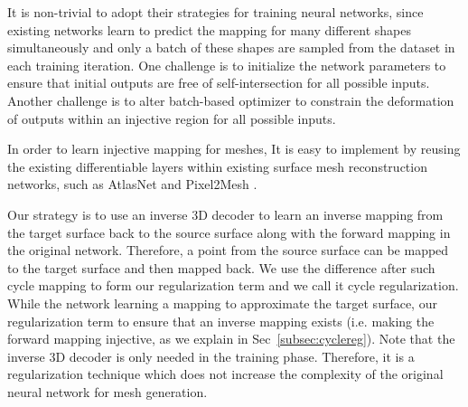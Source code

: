 
It is non-trivial to adopt their strategies for training neural networks, since existing networks learn to predict the mapping for many different shapes simultaneously and only a batch of these shapes are sampled from the dataset in each training iteration. One challenge is to initialize the network parameters to ensure that initial outputs are free of self-intersection for all possible inputs. Another challenge is to alter batch-based optimizer to constrain the deformation of outputs within an injective region for all possible inputs. 

In order to learn injective mapping for meshes,  It is easy to implement by reusing the existing differentiable layers within existing surface mesh reconstruction networks, such as AtlasNet \cite{atlasnet} and Pixel2Mesh \cite{pixel2mesh}.

 Our strategy is to use an inverse 3D decoder to learn an inverse mapping from the target surface back to the source surface along with the forward mapping in the original network. Therefore, a point from the source surface can be mapped to the target surface and then mapped back. We use the difference after such cycle mapping to form our regularization term and we call it cycle regularization. While the network learning a mapping to approximate the target surface, our regularization term  to ensure that an inverse mapping exists (i.e. making the forward mapping injective, as we explain in Sec~\ref{subsec:cyclereg}).
Note that the inverse 3D decoder is only needed in the training phase. Therefore, it is a regularization technique which does not increase the complexity of the original neural network for mesh generation.

